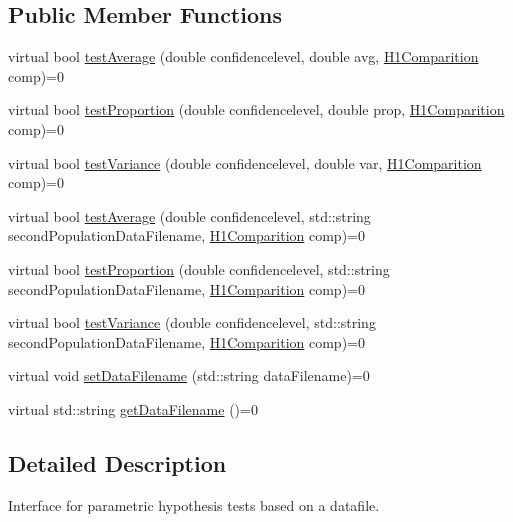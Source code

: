 \subsection*{Public Member Functions}
\begin{DoxyCompactItemize}
\item 
virtual bool \hyperlink{class_hypothesis_tester__if_a00a01e530acaf3f4db644b439c1c162e}{test\-Average} (double confidencelevel, double avg, \hyperlink{class_hypothesis_tester__if_a89153ff990252f9f79856a2f2532c349}{H1\-Comparition} comp)=0
\item 
virtual bool \hyperlink{class_hypothesis_tester__if_a9a07fdf3648371e4595acb3599f7b03b}{test\-Proportion} (double confidencelevel, double prop, \hyperlink{class_hypothesis_tester__if_a89153ff990252f9f79856a2f2532c349}{H1\-Comparition} comp)=0
\item 
virtual bool \hyperlink{class_hypothesis_tester__if_a1734abfa4bd0c3e8fc67c96172aca728}{test\-Variance} (double confidencelevel, double var, \hyperlink{class_hypothesis_tester__if_a89153ff990252f9f79856a2f2532c349}{H1\-Comparition} comp)=0
\item 
virtual bool \hyperlink{class_hypothesis_tester__if_a0c0314bc8ff8bef239583f2c8af4ed56}{test\-Average} (double confidencelevel, std\-::string second\-Population\-Data\-Filename, \hyperlink{class_hypothesis_tester__if_a89153ff990252f9f79856a2f2532c349}{H1\-Comparition} comp)=0
\item 
virtual bool \hyperlink{class_hypothesis_tester__if_a10b193007a3fde816120b32903241336}{test\-Proportion} (double confidencelevel, std\-::string second\-Population\-Data\-Filename, \hyperlink{class_hypothesis_tester__if_a89153ff990252f9f79856a2f2532c349}{H1\-Comparition} comp)=0
\item 
virtual bool \hyperlink{class_hypothesis_tester__if_ad2360392ccf3858da38092448152c33d}{test\-Variance} (double confidencelevel, std\-::string second\-Population\-Data\-Filename, \hyperlink{class_hypothesis_tester__if_a89153ff990252f9f79856a2f2532c349}{H1\-Comparition} comp)=0
\item 
virtual void \hyperlink{class_hypothesis_tester__if_ae7cfc801a3c0206844e3bc73e0b4234a}{set\-Data\-Filename} (std\-::string data\-Filename)=0
\item 
virtual std\-::string \hyperlink{class_hypothesis_tester__if_a37b02ea209d8f6b566af9e2fff6511cc}{get\-Data\-Filename} ()=0
\end{DoxyCompactItemize}


\subsection{Detailed Description}
Interface for parametric hypothesis tests based on a datafile. 

